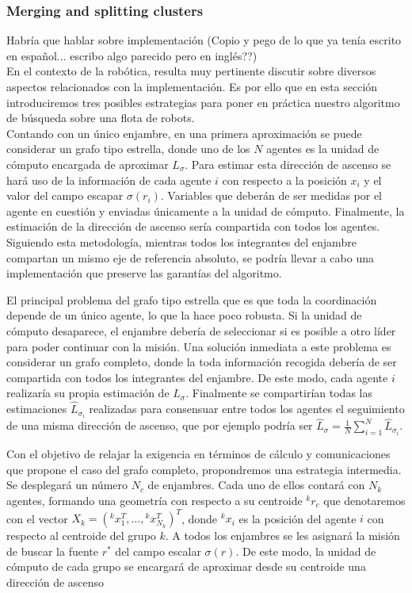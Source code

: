 \subsubsection{Merging and splitting clusters}

{\color{red}
Habría que hablar sobre implementación (Copio y pego de lo que ya tenía escrito en español... escribo algo parecido pero en inglés??)\\

En el contexto de la robótica, resulta muy pertinente discutir sobre diversos aspectos relacionados con la implementación. Es por ello que en esta sección introduciremos tres posibles estrategias para poner en práctica nuestro algoritmo de búsqueda sobre una flota de robots.\\

Contando con un único enjambre, en una primera aproximación se puede considerar un grafo tipo estrella, donde uno de los $N$ agentes es la unidad de cómputo encargada de aproximar $L_\sigma$. Para estimar esta dirección de ascenso se hará uso de la información de cada agente $i$ con respecto a la posición $x_i$ y el valor del campo escapar $\sigma(r_i)$. Variables que deberán de ser medidas por el agente en cuestión y enviadas únicamente a la unidad de cómputo. Finalmente, la estimación de la dirección de ascenso sería compartida con todos los agentes. Siguiendo esta metodología, mientras todos los integrantes del enjambre compartan un mismo eje de referencia absoluto, se podría llevar a cabo una implementación que preserve las garantías del algoritmo.

El principal problema del grafo tipo estrella que es que toda la coordinación depende de un único agente, lo que la hace poco robusta. Si la unidad de cómputo desaparece, el enjambre debería de seleccionar si es posible a otro líder para poder continuar con la misión. Una solución inmediata a este problema es considerar un grafo completo, donde la toda información recogida debería de ser compartida con todos los integrantes del enjambre. De este modo, cada agente $i$ realizaría su propia estimación de $L_\sigma$. Finalmente se compartirían todas las estimaciones $\hat L_{\sigma_i}$ realizadas para consensuar entre todos los agentes el seguimiento de una misma dirección de ascenso, que por ejemplo podría ser $\hat L_{\sigma} = \frac{1}{N}\sum_{i=1}^N\hat L_{\sigma_i}$.

Con el objetivo de relajar la exigencia en términos de cálculo y comunicaciones que propone el caso del grafo completo, propondremos una estrategia intermedia. Se desplegará un número $N_c$ de enjambres. Cada uno de ellos contará con $N_k$ agentes, formando una geometría con respecto a su centroide $^kr_c$ que denotaremos con el vector $X_k = (^kx_{1}^T, \dots, {}^kx_{N_k}^T)^T$, donde $^kx_i$ es la posición del agente $i$ con respecto al centroide del grupo $k$. A todos los enjambres se les asignará la misión de buscar la fuente $r^*$ del campo escalar $\sigma(r)$. De este modo, la unidad de cómputo de cada grupo se encargará de aproximar desde su centroide una dirección de ascenso
}

